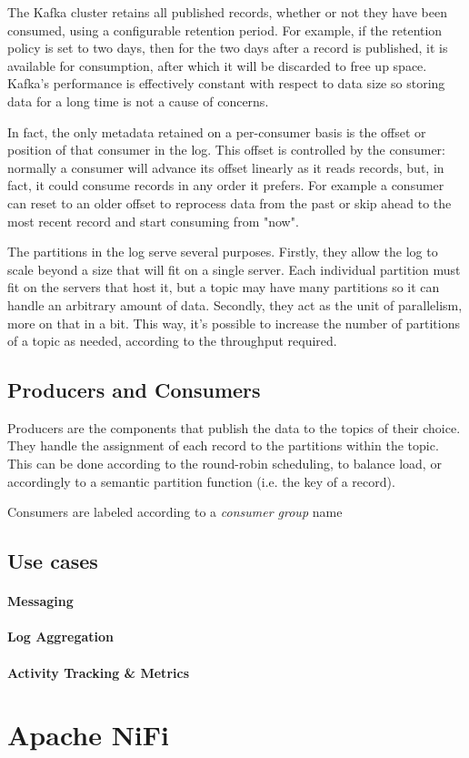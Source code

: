 The Kafka cluster retains all published records, whether or not they have been consumed, using a configurable retention period. For example, if the retention policy is set to two days, then for the two days after a record is published, it is available for consumption, after which it will be discarded to free up space. Kafka's performance is effectively constant with respect to data size so storing data for a long time is not a cause of concerns.

In fact, the only metadata retained on a per-consumer basis is the offset or position of that consumer in the log. This offset is controlled by the consumer: normally a consumer will advance its offset linearly as it reads records, but, in fact, it could consume records in any order it prefers. For example a consumer can reset to an older offset to reprocess data from the past or skip ahead to the most recent record and start consuming from "now".

The partitions in the log serve several purposes. Firstly, they allow the log to scale beyond a size that will fit on a single server. Each individual partition must fit on the servers that host it, but a topic may have many partitions so it can handle an arbitrary amount of data. Secondly, they act as the unit of parallelism, more on that in a bit. This way, it's possible to increase the number of partitions of a topic as needed, according to the throughput required.

\subsection{Producers and Consumers}

Producers are the components that publish the data to the topics of their choice. They handle the assignment of each record to the partitions within the topic. This can be done according to the round-robin scheduling, to balance load, or accordingly to a semantic partition function (i.e. the key of a record).

Consumers are labeled according to a \textit{consumer group} name

\subsection{Use cases}

\paragraph{Messaging}
\paragraph{Log Aggregation}
\paragraph{Activity Tracking \& Metrics}


\section{Apache NiFi}

